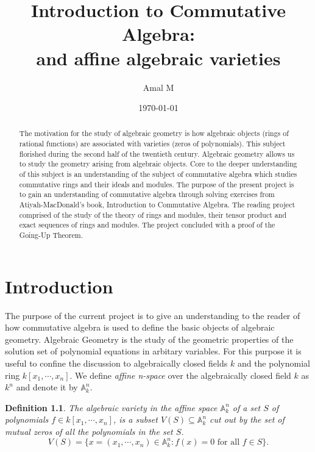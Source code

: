 \documentclass[]{report}
\newtheorem{defn}[theorem]{Definition}
\begin{document}
\title{
    Introduction to Commutative Algebra: \\
    
    \large and affine algebraic varieties}
\author{Amal M}
\date{\today}
\maketitle

\begin{abstract}

    The motivation for the study of algebraic geometry is how algebraic objects (rings of rational functions) are associated with varieties (zeros of polynomials). This subject florished during the second half of the twentieth century. Algebraic geometry allows us to study the geometry arising from algebraic objects. Core to the deeper understanding of this subject is an understanding of the subject of commutative algebra which studies commutative rings and their ideals and modules. The purpose of the present project is to gain an understanding of commutative algebra through solving exercises from Atiyah-MacDonald's book, Introduction to Commutative Algebra. The reading project comprised of the study of the theory of rings and modules, their tensor product and exact sequences of rings and modules. The project concluded with a proof of the Going-Up Theorem.

\end{abstract}

\tableofcontents
\newpage

\chapter{Introduction}

The purpose of the current project is to give an understanding 
to the reader of how commutative algebra is used to define the basic
objects of algebraic geometry. Algebraic Geometry is the study of
the geometric properties of the solution set of polynomial equations
in arbitary variables. For this purpose it is useful to confine the 
discussion to algebraically closed fields $k$ and the polynomial ring
$k[x_1,\cdots,x_n]$. We define \textit{affine n-space} over the algebraically closed field $k$ as $k^n$ and denote it by $\mathbb{A}^n_k$.

\begin{defn} The algebraic variety \cite{vakil145} in the affine space $\mathbb{A}^n_k$ of a set $S$ of polynomials $f\in k[x_1,\cdots, x_n]$, is a subset $V(S)\subseteq \mathbb{A}^n_k$ cut out by the set of mutual zeros of all the polynomials in the set $S$.  
    $$V(S) = \{x = (x_1,\cdots,x_n) \in \mathbb{A}^n_k : f(x) = 0 \text{ for all } f \in S\}.$$
\end{defn}
\end{document}
